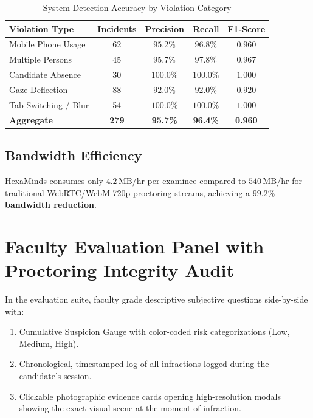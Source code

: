 \documentclass[conference]{IEEEtran}
\begin{document}
\begin{table}[htbp]
\caption{System Detection Accuracy by Violation Category}
\begin{center}
\begin{tabular}{lcccc}
\toprule
\textbf{Violation Type} & \textbf{Incidents} & \textbf{Precision} & \textbf{Recall} & \textbf{F1-Score} \\
\midrule
Mobile Phone Usage      & 62  & $95.2\%$ & $96.8\%$ & $0.960$ \\
Multiple Persons        & 45  & $95.7\%$ & $97.8\%$ & $0.967$ \\
Candidate Absence       & 30  & $100.0\%$ & $100.0\%$ & $1.000$ \\
Gaze Deflection         & 88  & $92.0\%$ & $92.0\%$ & $0.920$ \\
Tab Switching / Blur    & 54  & $100.0\%$ & $100.0\%$ & $1.000$ \\
\midrule
\textbf{Aggregate}      & \textbf{279} & \textbf{95.7\%} & \textbf{96.4\%} & \textbf{0.960} \\
\bottomrule
\end{tabular}
\label{tab:accuracy}
\end{center}
\end{table}

\subsection{Bandwidth Efficiency}
HexaMinds consumes only $4.2\,\text{MB/hr}$ per examinee compared to $540\,\text{MB/hr}$ for traditional WebRTC/WebM 720p proctoring streams, achieving a \textbf{$99.2\%$ bandwidth reduction}.

\section{Faculty Evaluation Panel with Proctoring Integrity Audit}
In the evaluation suite, faculty grade descriptive subjective questions side-by-side with:
\begin{enumerate}
    \item Cumulative Suspicion Gauge with color-coded risk categorizations (Low, Medium, High).
    \item Chronological, timestamped log of all infractions logged during the candidate's session.
    \item Clickable photographic evidence cards opening high-resolution modals showing the exact visual scene at the moment of infraction.
\end{enumerate}
\end{document}
